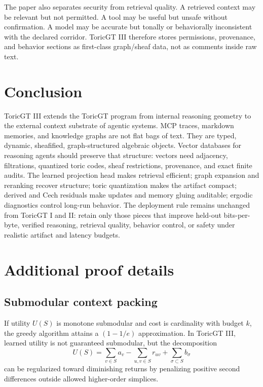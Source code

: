 \documentclass[11pt]{article}
\numberwithin{equation}{section}
\begin{document}
The paper also separates security from retrieval quality. A retrieved context may be relevant but not permitted. A tool may be useful but unsafe without confirmation. A model may be accurate but tonally or behaviorally inconsistent with the declared corridor. ToricGT III therefore stores permissions, provenance, and behavior sections as first-class graph/sheaf data, not as comments inside raw text.

\section{Conclusion}
ToricGT III extends the ToricGT program from internal reasoning geometry to the external context substrate of agentic systems. MCP traces, markdown memories, and knowledge graphs are not flat bags of text. They are typed, dynamic, sheafified, graph-structured algebraic objects. Vector databases for reasoning agents should preserve that structure: vectors need adjacency, filtrations, quantized toric codes, sheaf restrictions, provenance, and exact finite audits. The learned projection head makes retrieval efficient; graph expansion and reranking recover structure; toric quantization makes the artifact compact; derived and Cech residuals make updates and memory gluing auditable; ergodic diagnostics control long-run behavior. The deployment rule remains unchanged from ToricGT I and II: retain only those pieces that improve held-out bits-per-byte, verified reasoning, retrieval quality, behavior control, or safety under realistic artifact and latency budgets.

\appendix
\section{Additional proof details}
\subsection{Submodular context packing}
If utility $U(S)$ is monotone submodular and cost is cardinality with budget $k$, the greedy algorithm attains a $(1-1/e)$ approximation. In ToricGT III, learned utility is not guaranteed submodular, but the decomposition
\begin{equation}
U(S)=\sum_{v\in S}a_v-\sum_{u,v\in S}r_{uv}+\sum_{\sigma\subset S}b_\sigma
\end{equation}
can be regularized toward diminishing returns by penalizing positive second differences outside allowed higher-order simplices.
\end{document}
